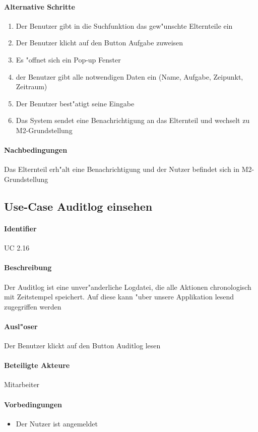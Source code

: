   \paragraph{Alternative Schritte}
  \begin{enumerate}
   \item Der Benutzer gibt in die Suchfunktion das gew"unschte Elternteile ein
   \item Der Benutzer klicht auf den Button \dq Aufgabe zuweisen\dq
   \item Es "offnet sich ein Pop-up Fenster
  \item der Benutzer gibt alle notwendigen Daten ein (Name, Aufgabe, Zeipunkt, Zeitraum)
  \item Der Benutzer best"atigt seine Eingabe
  \item Das System sendet eine Benachrichtigung an das Elternteil und wechselt zu M2-Grundstellung
  \end{enumerate}
  \paragraph{Nachbedingungen}
  Das Elternteil erh"alt eine Benachrichtigung und der Nutzer befindet sich in M2-Grundstellung

  
  \newpage
 \subsection{Use-Case Auditlog einsehen}
  \paragraph{Identifier}
  UC 2.16
  \paragraph{Beschreibung}
  Der Auditlog ist eine unver"anderliche Logdatei, die alle Aktionen chronologisch mit Zeitstempel speichert. Auf diese kann "uber unsere Applikation lesend zugegriffen werden 
  \paragraph{Ausl"oser}
  Der Benutzer klickt auf den Button \dq Auditlog lesen\dq
  \paragraph{Beteiligte Akteure}   \leavevmode \newline
    Mitarbeiter
  \paragraph{Vorbedingungen}
  \begin{itemize}
   \item Der Nutzer ist angemeldet
  \end{itemize}

